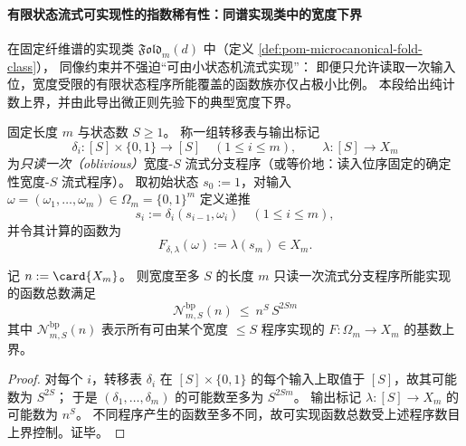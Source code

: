 \paragraph{有限状态流式可实现性的指数稀有性：同谱实现类中的宽度下界}
在固定纤维谱的实现类 \(\mathfrak{Fold}_m(d)\) 中（定义 \ref{def:pom-microcanonical-fold-class}），
同像约束并不强迫“可由小状态机流式实现”：
即便只允许读取一次输入位，宽度受限的有限状态程序所能覆盖的函数族亦仅占极小比例。
本段给出纯计数上界，并由此导出微正则先验下的典型宽度下界。

\begin{definition}\label{def:pom-oblivious-widthS-branching-program}
固定长度 \(m\) 与状态数 \(S\ge 1\)。
称一组转移表与输出标记
\[
\delta_i:[S]\times\{0,1\}\to [S]\quad(1\le i\le m),
\qquad
\lambda:[S]\to X_m
\]
为\emph{只读一次（oblivious）}宽度-\(S\) 流式分支程序（或等价地：读入位序固定的确定性宽度-\(S\) 流式程序）。
取初始状态 \(s_0:=1\)，对输入 \(\omega=(\omega_1,\dots,\omega_m)\in\Omega_m=\{0,1\}^m\) 定义递推
\[
s_i:=\delta_i(s_{i-1},\omega_i)\quad(1\le i\le m),
\]
并令其计算的函数为
\[
F_{\delta,\lambda}(\omega):=\lambda(s_m)\in X_m.
\]
\end{definition}

\begin{theorem}[宽度受限流式程序的可实现函数计数上界]\label{thm:pom-oblivious-widthS-branching-program-count}
记 \(n:=\card{X_m}\)。
则宽度至多 \(S\) 的长度 \(m\) 只读一次流式分支程序所能实现的函数总数满足
\[
\boxed{\;
\mathcal N^{\mathrm{bp}}_{m,S}(n)
\ \le\ n^{S}\,S^{2Sm}\;}
\]
其中 \(\mathcal N^{\mathrm{bp}}_{m,S}(n)\) 表示所有可由某个宽度 \(\le S\) 程序实现的 \(F:\Omega_m\to X_m\) 的基数上界。
\end{theorem}
\begin{proof}
对每个 \(i\)，转移表 \(\delta_i\) 在 \([S]\times\{0,1\}\) 的每个输入上取值于 \([S]\)，故其可能数为
\(
S^{2S}
\)；
于是 \((\delta_1,\dots,\delta_m)\) 的可能数至多为 \(S^{2Sm}\)。
输出标记 \(\lambda:[S]\to X_m\) 的可能数为 \(n^S\)。
不同程序产生的函数至多不同，故可实现函数总数受上述程序数目上界控制。证毕。
\end{proof}

